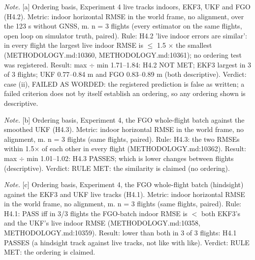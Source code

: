 \begin{table}[htbp]
\textit{Note.} [a] Ordering basis, Experiment 4 live tracks indoors, EKF3, UKF and FGO (H4.2). Metric: indoor horizontal RMSE in the world frame, no alignment, over the 123 s without GNSS, m. n = 3 flights (every estimator on the same flights, open loop on simulator truth, paired). Rule: H4.2 'live indoor errors are similar': in every flight the largest live indoor RMSE is $\le$ 1.5 $\times$ the smallest (METHODOLOGY.md:10360, METHODOLOGY.md:10361); no ordering test was registered. Result: max $\div$ min 1.71--1.84: H4.2 NOT MET; EKF3 largest in 3 of 3 flights; UKF 0.77--0.84 m and FGO 0.83--0.89 m (both descriptive). Verdict: case (ii), FAILED AS WORDED: the registered prediction is false as written; a failed criterion does not by itself establish an ordering, so any ordering shown is descriptive.\par
\textit{Note.} [b] Ordering basis, Experiment 4, the FGO whole-flight batch against the smoothed UKF (H4.3). Metric: indoor horizontal RMSE in the world frame, no alignment, m. n = 3 flights (same flights, paired). Rule: H4.3: the two RMSEs within 1.5$\times$ of each other in every flight (METHODOLOGY.md:10362). Result: max $\div$ min 1.01--1.02: H4.3 PASSES; which is lower changes between flights (descriptive). Verdict: RULE MET: the similarity is claimed (no ordering).\par
\textit{Note.} [c] Ordering basis, Experiment 4, the FGO whole-flight batch (hindsight) against the EKF3 and UKF live tracks (H4.1). Metric: indoor horizontal RMSE in the world frame, no alignment, m. n = 3 flights (same flights, paired). Rule: H4.1: PASS iff in 3/3 flights the FGO-batch indoor RMSE is $<$ both EKF3's and the UKF's live indoor RMSE (METHODOLOGY.md:10358, METHODOLOGY.md:10359). Result: lower than both in 3 of 3 flights: H4.1 PASSES (a hindsight track against live tracks, not like with like). Verdict: RULE MET: the ordering is claimed.\par
\end{table}
